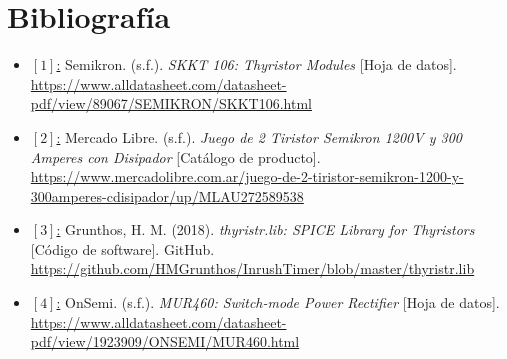 \documentclass[12pt,a4paper]{article}
\begin{document}
\section{Bibliografía}
\begin{itemize}
    \raggedright
    \item \underline{$[1]$:} Semikron. (s.f.). \textit{SKKT 106: Thyristor Modules} [Hoja de datos]. \url{https://www.alldatasheet.com/datasheet-pdf/view/89067/SEMIKRON/SKKT106.html}
    
    \item \underline{$[2]$:} Mercado Libre. (s.f.). \textit{Juego de 2 Tiristor Semikron 1200V y 300 Amperes con Disipador} [Catálogo de producto]. \url{https://www.mercadolibre.com.ar/juego-de-2-tiristor-semikron-1200-y-300amperes-cdisipador/up/MLAU272589538}

    \item \underline{$[3]$:} Grunthos, H. M. (2018). \textit{thyristr.lib: SPICE Library for Thyristors} [Código de software]. GitHub. \url{https://github.com/HMGrunthos/InrushTimer/blob/master/thyristr.lib}

    \item \underline{$[4]$:} OnSemi. (s.f.). \textit{MUR460: Switch-mode Power Rectifier} [Hoja de datos]. \url{https://www.alldatasheet.com/datasheet-pdf/view/1923909/ONSEMI/MUR460.html}
\end{itemize}
\end{document}
